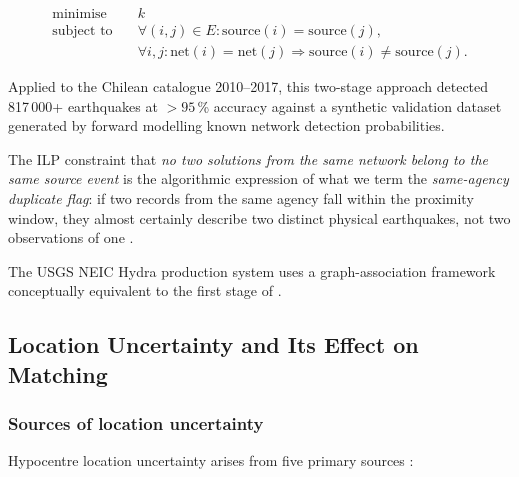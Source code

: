 \documentclass[12pt]{article}
\begin{document}
\begin{equation}
  \begin{aligned}
    \text{minimise} \quad & k \\
    \text{subject to} \quad
      & \forall (i,j) \in E : \mathrm{source}(i) = \mathrm{source}(j), \\
      & \forall i,j : \mathrm{net}(i) = \mathrm{net}(j) \Rightarrow \mathrm{source}(i) \neq \mathrm{source}(j).
  \end{aligned}
  \label{eq:ilp}
\end{equation}

Applied to the Chilean catalogue 2010--2017, this two-stage approach detected
817\,000+ earthquakes at $> 95$\,\% accuracy against a synthetic validation
dataset generated by forward modelling known network detection probabilities.

The ILP constraint that \emph{no two solutions from the same network belong to the
same source event} is the algorithmic expression of what we term the
\emph{same-agency duplicate flag}: if two records from the same agency fall
within the proximity window, they almost certainly describe two distinct physical
earthquakes, not two observations of one \citep{Patton2016, Tanaka2022}.

The USGS NEIC Hydra production system uses a graph-association framework
conceptually equivalent to the first stage of \citet{Patton2016}
\citep{usgs_comcat}.

\subsection{Location Uncertainty and Its Effect on Matching}
\label{sec:locuncert}

\subsubsection{Sources of location uncertainty}

Hypocentre location uncertainty arises from five primary sources
\citep{Bondar2004, Engdahl1998}:
\end{document}

